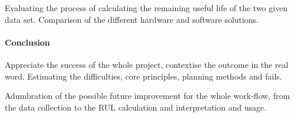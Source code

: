 Evaluating the process of calculating the remaining useful life of the two given data set. Comparison of the different hardware and software solutions.

		\paragraph{Conclusion}

Appreciate the success of the whole project, contextise the outcome in the real word. Estimating the difficulties, core principles, planning methods and fails.

Adumbration of the possible future improvement for the whole work-flow, from the data collection to the RUL calculation and interpretation and usage.

